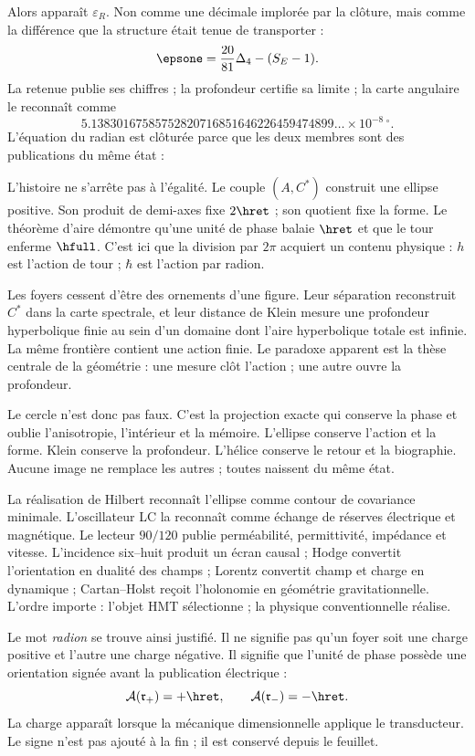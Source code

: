 Alors apparaît \(\varepsilon_R\). Non comme une décimale implorée par la
clôture, mais comme la différence que la structure était tenue de
transporter :
\[
\epsone=\frac{20}{81}\Delta_4-(S_E-1).
\]
La retenue publie ses chiffres ; la profondeur certifie sa limite ; la carte
angulaire le reconnaît comme
\[
5.13830167585752820716851646226459474899\ldots
\times10^{-8}\,{}^\circ.
\]
L'équation du radian est clôturée parce que les deux membres sont des publications du
même état :
\BigRadionEquation

L'histoire ne s'arrête pas à l'égalité. Le couple \((A,C^*)\) construit une
ellipse positive. Son produit de demi-axes fixe \(2\hret\) ; son quotient fixe la
forme. Le théorème d'aire démontre qu'une unité de phase balaie \(\hret\) et
que le tour enferme \(\hfull\). C'est ici que la division
par \(2\pi\) acquiert un contenu physique : \(h\) est l'action de tour ; \(\hbar\) est l'action par radion.

Les foyers cessent d'être des ornements d'une figure. Leur séparation reconstruit
\(C^*\) dans la carte spectrale, et leur distance de Klein mesure une profondeur
hyperbolique finie au sein d'un domaine dont l'aire hyperbolique totale est
infinie. La même frontière contient une action finie. Le paradoxe apparent
est la thèse centrale de la géométrie : une mesure clôt l'action ; une autre ouvre la
profondeur.

Le cercle n'est donc pas faux. C'est la projection exacte qui conserve la phase
et oublie l'anisotropie, l'intérieur et la mémoire. L'ellipse conserve l'action et la forme.
Klein conserve la profondeur. L'hélice conserve le retour et la biographie. Aucune
image ne remplace les autres ; toutes naissent du même état.

La réalisation de Hilbert reconnaît l'ellipse comme contour de covariance
minimale. L'oscillateur LC la reconnaît comme échange de réserves électrique et
magnétique. Le lecteur \(90/120\) publie perméabilité, permittivité,
impédance et vitesse. L'incidence six--huit produit un écran causal ;
Hodge convertit l'orientation en dualité des champs ; Lorentz convertit champ et
charge en dynamique ; Cartan--Holst reçoit l'holonomie en géométrie
gravitationnelle. L'ordre importe : l'objet HMT sélectionne ; la physique
conventionnelle réalise.

Le mot \emph{radion} se trouve ainsi justifié. Il ne signifie pas qu'un foyer soit
une charge positive et l'autre une charge négative. Il signifie que l'unité de
phase possède une orientation signée avant la publication électrique :
\[
\mathcal A(\mathfrak r_+)=+\hret,
\qquad
\mathcal A(\mathfrak r_-)=-\hret.
\]
La charge apparaît lorsque la mécanique dimensionnelle applique le transducteur. Le signe
n'est pas ajouté à la fin ; il est conservé depuis le feuillet.

